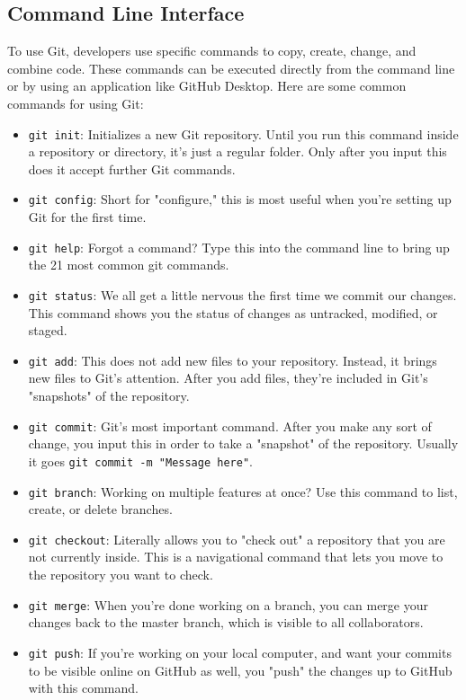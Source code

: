 \subsection{Command Line Interface}

To use Git, developers use specific commands to copy, create, change, and combine code. These commands can be executed directly from the command line or by using an application like GitHub Desktop. Here are some common commands for using Git:

\begin{itemize}
    \item \texttt{git init}: Initializes a new Git repository. Until you run this command inside a repository or directory, it's just a regular folder. Only after you input this does it accept further Git commands.
    \item \texttt{git config}: Short for "configure," this is most useful when you're setting up Git for the first time.
    \item \texttt{git help}: Forgot a command? Type this into the command line to bring up the 21 most common git commands.
    \item \texttt{git status}: We all get a little nervous the first time we commit our changes. This command shows you the status of changes as untracked, modified, or staged.
    \item \texttt{git add}: This does not add new files to your repository. Instead, it brings new files to Git's attention. After you add files, they're included in Git's "snapshots" of the repository.
    \item \texttt{git commit}: Git's most important command. After you make any sort of change, you input this in order to take a "snapshot" of the repository. Usually it goes \texttt{git commit -m "Message here"}.
    \item \texttt{git branch}: Working on multiple features at once? Use this command to list, create, or delete branches.
    \item \texttt{git checkout}: Literally allows you to "check out" a repository that you are not currently inside. This is a navigational command that lets you move to the repository you want to check.
    \item \texttt{git merge}: When you're done working on a branch, you can merge your changes back to the master branch, which is visible to all collaborators.
    \item \texttt{git push}: If you're working on your local computer, and want your commits to be visible online on GitHub as well, you "push" the changes up to GitHub with this command.

\end{itemize}
